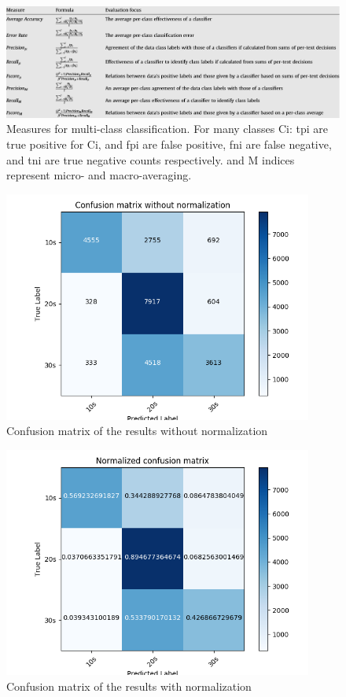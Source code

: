 \documentclass{clv3}
\begin{document}
\begin{figure}[h]
\includegraphics[width=15cm]{performancemeasures.PNG}
\columnbreak
\caption{ Measures for multi-class classification. For many classes Ci: tpi are true positive for Ci, and fpi are false positive, fni are false negative, and tni are true negative counts respectively. \textmu \space and M indices represent micro- and macro-averaging. \cite{sokolova2009systematic} }
\label{Fig.2}
\end{figure}

\clearpage
\begin{figure}[h]
\includegraphics[width=4in]{c0.png}
\caption{ Confusion matrix of the results without normalization }
\label{Fig.3}
\end{figure}


\begin{figure}[h]
\includegraphics[width=4in]{c1.png}
\caption{ Confusion matrix of the results with normalization }
\label{Fig.4}
\end{figure}
\end{document}
